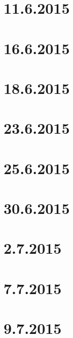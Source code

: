 \documentclass[12pt,twoside]{article}
\begin{document}
\section{11.6.2015}

\newpage
\section{16.6.2015}

\section{18.6.2015}

\section{23.6.2015}

\newpage
\section{25.6.2015}

\section{30.6.2015}

\section{2.7.2015}

\section{7.7.2015}

\section{9.7.2015}

%
\end{document}
